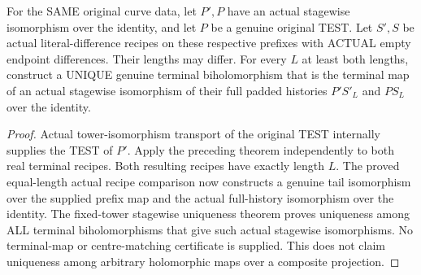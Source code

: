 \begin{theorem}
\label{hir:sharp-original-curve-unequal-terminal-recipe-comparison}
\leanok
For the SAME original curve data, let $P',P$ have an actual stagewise
isomorphism over the identity, and let $P$ be a genuine original TEST.
Let $S',S$ be actual literal-difference recipes on these respective
prefixes with ACTUAL empty endpoint differences. Their lengths may
differ. For every $L$ at least both lengths, construct a UNIQUE genuine
terminal biholomorphism that is the terminal map of an actual stagewise
isomorphism of their full padded histories $P'S'_L$ and $PS_L$ over the
identity.
\end{theorem}
\begin{proof}
Actual tower-isomorphism transport of the original TEST internally
supplies the TEST of $P'$. Apply the preceding theorem independently
to both real terminal recipes. Both resulting recipes have exactly
length $L$. The proved equal-length actual recipe comparison now
constructs a genuine tail isomorphism over the supplied prefix map and
the actual full-history isomorphism over the identity. The fixed-tower
stagewise uniqueness theorem proves uniqueness among ALL terminal
biholomorphisms that give such actual stagewise isomorphisms. No
terminal-map or centre-matching certificate is supplied. This does not
claim uniqueness among arbitrary holomorphic maps over a composite
projection.
\end{proof}

